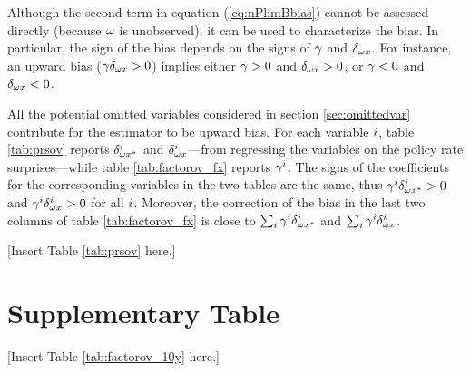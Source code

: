 \documentclass[a4paper,12pt]{article} 		%
\begin{document}
\begin{appendices}
Although the second term in equation (\ref{eq:nPlimBbias}) cannot be assessed directly (because \(\omega\) is unobserved), it can be used to characterize the bias. In particular, the sign of the bias depends on the signs of \(\gamma\) and \(\delta_{\omega x}\). For instance, an upward bias (\(\gamma \delta_{\omega x} > 0\)) implies either \(\gamma > 0\) and \(\delta_{\omega x} > 0\), or \(\gamma < 0\) and \(\delta_{\omega x} < 0\). 

All the potential omitted variables considered in section \ref{sec:omittedvar} contribute for the estimator to be upward bias. For each variable \(i\), table \ref{tab:prsov} reports \(\delta_{\omega x^{*}}^{i}\) and \(\delta_{\omega x}^{i}\)---from regressing the variables on the policy rate surprises---while table \ref{tab:factorov_fx} reports \(\gamma^{i}\). The signs of the coefficients for the corresponding variables in the two tables are the same, thus \(\gamma^{i} \delta_{\omega x^{*}}^{i} > 0\) and \(\gamma^{i} \delta_{\omega x}^{i} > 0\) for all \(i\). Moreover, the correction of the bias in the last two columns of table \ref{tab:factorov_fx} is close to \(\sum_{i} \gamma^{i} \delta_{\omega x^{*}}^{i}\) and \(\sum_{i} \gamma^{i} \delta_{\omega x}^{i}\).

\begin{center}
	[Insert Table \ref{tab:prsov} here.]
\end{center}

\renewcommand{\thetable}{\thesection\arabic{table}}
\section{Supplementary Table} \label{sec:AppTables}

\begin{center}
	[Insert Table \ref{tab:factorov_10y} here.]
\end{center}

\newpage

\begin{landscape}
	\newpage
\end{landscape}

\end{appendices}


\titleformat{\section}{\large\bfseries}{}{0pt}{}
\uspunctuation
\printbibliography[title={LITERATURE CITED}]
\end{document}
